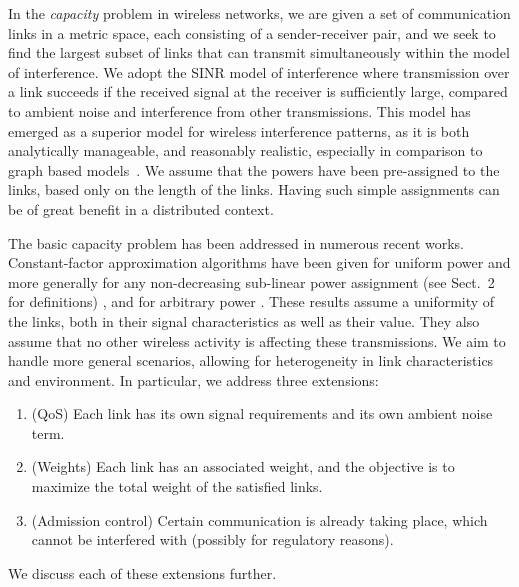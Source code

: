 \documentclass[11pt]{amsart}
\begin{document}
In the \emph{capacity} problem in wireless networks, we are given a
set of communication links in a metric space, each consisting of
a sender-receiver pair, and we seek to find the largest subset of links
that can transmit simultaneously within the model of interference.  We
adopt the SINR model of interference where transmission over a link
succeeds if the received signal at the receiver is sufficiently large,
compared to ambient noise and interference from other transmissions.
This model has emerged as a superior model for wireless interference
patterns, as it is both analytically manageable, and reasonably
realistic, especially in comparison to graph based
models~\cite{GronkMibiHoc01,MaheshwariJD08,Moscibroda2006Protocol}.
We assume that the powers have been pre-assigned to the links, based
only on the length of the links. Having such simple assignments can be of great benefit
in a distributed context.

The basic capacity problem has been addressed in numerous recent
works. Constant-factor approximation algorithms have been given for
uniform power \cite{GHWW09} and more generally for any non-decreasing
sub-linear power assignment (see Sect.~2 for definitions) \cite{SODA11}, and for arbitrary power 
\cite{KesselheimSoda11}. 
These results assume a uniformity of the links, both in their signal
characteristics as well as their value. They also assume that no other
wireless activity is affecting these transmissions. 
We aim to handle more general scenarios, allowing for heterogeneity in
link characteristics and environment.
In particular, we address three extensions:
\begin{enumerate}
 \item (QoS) Each link has its own signal requirements and its own
   ambient noise term.
 \item (Weights) Each link has an associated weight, and the
   objective is to maximize the total weight of the satisfied links.
 \item (Admission control) Certain communication is already taking
   place, which cannot be interfered with (possibly for regulatory reasons).
\end{enumerate}
We discuss each of these extensions further.

\iffalse
We consider the fundamental \emph{capacity} problem in wireless networks.
Given is a set of communication links , where a link  is a directed pair of a ``sender''  and a ``receiver'' . Senders and receivers are points in a metric space. Each link represents a intended wireless communication from the sender to the receiver.
The \emph{capacity} of this network is the size of the largest subset of  that
can successfully transmit simultaneously, given some model of interference among simultaneously transmitting links.
\fi
\end{document}
